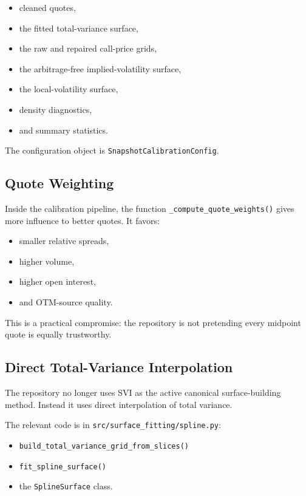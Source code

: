 \documentclass[11pt]{article}
\begin{document}
\begin{itemize}
  \item cleaned quotes,
  \item the fitted total-variance surface,
  \item the raw and repaired call-price grids,
  \item the arbitrage-free implied-volatility surface,
  \item the local-volatility surface,
  \item density diagnostics,
  \item and summary statistics.
\end{itemize}

The configuration object is \texttt{SnapshotCalibrationConfig}.

\subsection{Quote Weighting}

Inside the calibration pipeline, the function
\texttt{\_compute\_quote\_weights()} gives more influence to better quotes. It favors:

\begin{itemize}
  \item smaller relative spreads,
  \item higher volume,
  \item higher open interest,
  \item and OTM-source quality.
\end{itemize}

This is a practical compromise: the repository is not pretending every midpoint quote is equally trustworthy.

\subsection{Direct Total-Variance Interpolation}

The repository no longer uses SVI as the active canonical surface-building method. Instead it uses direct interpolation of total variance.

The relevant code is in \texttt{src/surface\_fitting/spline.py}:

\begin{itemize}
  \item \texttt{build\_total\_variance\_grid\_from\_slices()}
  \item \texttt{fit\_spline\_surface()}
  \item the \texttt{SplineSurface} class.
\end{itemize}
\end{document}
